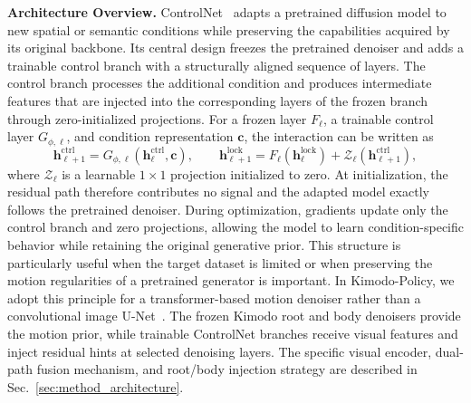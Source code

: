 \textbf{Architecture Overview.} ControlNet~\citep{zhang2023adding} adapts a pretrained diffusion model to new spatial or semantic conditions while preserving the capabilities acquired by its original backbone. Its central design freezes the pretrained denoiser and adds a trainable control branch with a structurally aligned sequence of layers. The control branch processes the additional condition and produces intermediate features that are injected into the corresponding layers of the frozen branch through zero-initialized projections. For a frozen layer $F_{\ell}$, a trainable control layer $G_{\phi,\ell}$, and condition representation $\mathbf{c}$, the interaction can be written as
\begin{equation}
  \mathbf{h}^{\mathrm{ctrl}}_{\ell+1}
  =G_{\phi,\ell}(\mathbf{h}^{\mathrm{ctrl}}_{\ell},\mathbf{c}),
  \qquad
  \mathbf{h}^{\mathrm{lock}}_{\ell+1}
  =F_{\ell}(\mathbf{h}^{\mathrm{lock}}_{\ell})
  +\mathcal{Z}_{\ell}\!\left(\mathbf{h}^{\mathrm{ctrl}}_{\ell+1}\right),
  \label{eq:controlnet_prelim}
\end{equation}
where $\mathcal{Z}_{\ell}$ is a learnable $1\!\times\!1$ projection initialized to zero. At initialization, the residual path therefore contributes no signal and the adapted model exactly follows the pretrained denoiser. During optimization, gradients update only the control branch and zero projections, allowing the model to learn condition-specific behavior while retaining the original generative prior. This structure is particularly useful when the target dataset is limited or when preserving the motion regularities of a pretrained generator is important. In Kimodo-Policy, we adopt this principle for a transformer-based motion denoiser rather than a convolutional image U-Net~\citep{ronneberger2015unetconvolutionalnetworksbiomedical}. The frozen Kimodo root and body denoisers provide the motion prior, while trainable ControlNet branches receive visual features and inject residual hints at selected denoising layers. The specific visual encoder, dual-path fusion mechanism, and root/body injection strategy are described in Sec.~\ref{sec:method_architecture}.
